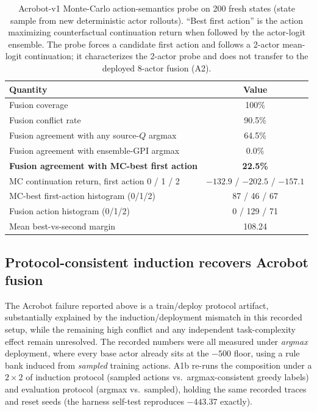 \documentclass[11pt]{article}
\begin{document}
\begin{table}[t]
\centering
\caption{Acrobot-v1 Monte-Carlo action-semantics probe on 200 fresh states (state sample from new
deterministic actor rollouts). ``Best first action'' is the action maximizing counterfactual
continuation return when followed by the actor-logit ensemble. The probe forces a candidate first action
and follows a 2-actor mean-logit continuation; it characterizes the 2-actor probe and does not transfer
to the deployed 8-actor fusion (A2).}
\label{tab:mcprobe}
\begin{tabular}{lc}
\toprule
Quantity & Value \\
\midrule
Fusion coverage & 100\% \\
Fusion conflict rate & 90.5\% \\
Fusion agreement with any source-$Q$ argmax & 64.5\% \\
Fusion agreement with ensemble-GPI argmax & 0.0\% \\
\textbf{Fusion agreement with MC-best first action} & \textbf{22.5\%} \\
MC continuation return, first action 0 / 1 / 2 & $-132.9$ / $-202.5$ / $-157.1$ \\
MC-best first-action histogram (0/1/2) & 87 / 46 / 67 \\
Fusion action histogram (0/1/2) & 0 / 129 / 71 \\
Mean best-vs-second margin & 108.24 \\
\bottomrule
\end{tabular}
\end{table}

\subsection{Protocol-consistent induction recovers Acrobot fusion}
\label{sec:experiments:acrobot:protocol}

The Acrobot failure reported above is a train/deploy protocol artifact, substantially explained by the
induction/deployment mismatch in this recorded setup, while the remaining high conflict and any
independent task-complexity effect remain unresolved. The recorded numbers were all measured under
\emph{argmax} deployment, where
every base actor already sits at the $-500$ floor, using a rule bank induced from \emph{sampled}
training actions. A1b re-runs the composition under a $2\times2$ of induction protocol (sampled actions
vs.\ argmax-consistent greedy labels) and evaluation protocol (argmax vs.\ sampled), holding the same
recorded traces and reset seeds (the harness self-test reproduces $-443.37$ exactly).
\end{document}

